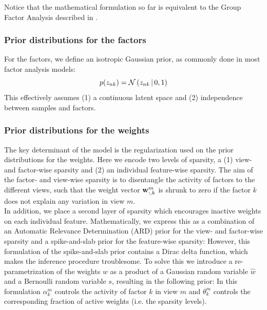 Notice that the mathematical formulation so far is equivalent to the Group Factor Analysis described in .

\subsubsection{Prior distributions for the factors}  \label{section:mofa_factors}
For the factors, we define an isotropic Gaussian prior, as commonly done in most factor analysis models:
\begin{equation}
	p(z_{nk}) = \mathcal{N}\left(z_{nk} \,|\, 0,1\right)
\end{equation}
This effectively  assumes (1) a continuous latent space and (2) independence between samples and factors. 

\subsubsection{Prior distributions for the weights}  \label{section:mofa_weights}
The key determinant of the model is the regularization used on the prior distributions for the weights. Here we encode two levels of sparsity, a (1) view- and factor-wise sparsity and (2) an individual feature-wise sparsity. The aim of the factor- and view-wise sparsity is to disentangle the activity of factors to the different views, such that the weight vector ${\bf w}_{:,k}^m$ is shrunk to zero if the factor $k$ does not explain any variation in view $m$. \\
In addition, we place a second layer of sparsity which encourages inactive weights on each individual feature. Mathematically, we express this as a combination of an Automatic Relevance Determination (ARD) prior \cite{Mackay1996} for the view- and factor-wise sparsity and a spike-and-slab prior \cite{Mitchell1988} for the feature-wise sparsity:
However, this formulation of the spike-and-slab prior contains a Dirac delta function, which makes the inference procedure troublesome. To solve this we introduce a re-parametrization of the weights $w$ as a product of a Gaussian random variable $\hat{w}$ and a Bernoulli random variable $s$, \cite{Titsias2011} resulting in the following prior:
In this formulation $\alpha_k^m$ controls the activity of factor $k$ in view $m$ and $\theta_k^m$ controls the corresponding fraction of active weights (i.e. the sparsity levels).\\


